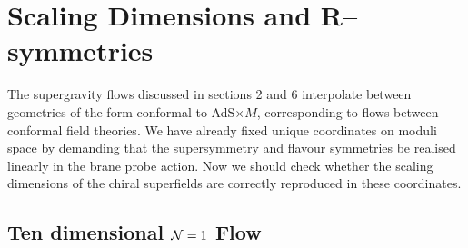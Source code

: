 \documentclass[a4paper,12pt]{article}
\begin{document}
\section{Scaling Dimensions and R--symmetries}
\label{scaling}


The supergravity flows discussed in sections 2 and 6 interpolate
between geometries of the form conformal to AdS$\times M$,
corresponding to flows between conformal field theories. We have
already fixed unique coordinates on moduli space by demanding that the
supersymmetry and flavour symmetries be realised linearly in the brane
probe action. Now we should check whether the scaling dimensions of
the chiral superfields are correctly reproduced in these coordinates.

\subsection{Ten dimensional ${\cal N} = 1$ Flow}
\label{scaling-10d}
\end{document}
